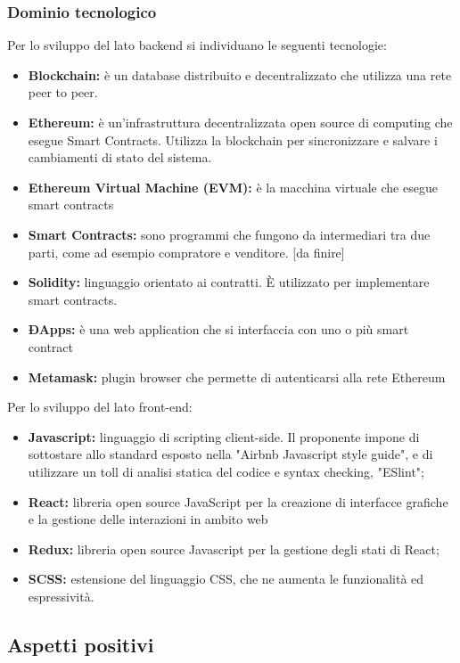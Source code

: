 \subsubsection{Dominio tecnologico}
Per lo sviluppo del lato backend si individuano le seguenti tecnologie:
\begin{itemize}
    \item \textbf{Blockchain: }è un database distribuito e 
    decentralizzato che utilizza una rete peer to peer.
	\item \textbf{Ethereum: }è un'infrastruttura decentralizzata open source di computing che
	esegue Smart Contracts. Utilizza la blockchain per sincronizzare e salvare i cambiamenti di stato
	del sistema.
	\item \textbf{Ethereum Virtual Machine (EVM): }è la macchina virtuale che esegue smart contracts
	\item \textbf{Smart Contracts: } sono programmi che fungono da intermediari tra due parti, come ad esempio
	compratore e venditore. [da finire]
	\item \textbf{Solidity: }linguaggio orientato ai contratti. \`E utilizzato per implementare smart contracts.
	\item \textbf{ÐApps: }è una web application che si interfaccia con uno o più smart contract
	\item \textbf{Metamask:} plugin browser che permette di autenticarsi alla rete Ethereum

\end{itemize}
Per lo sviluppo del lato front-end:
\begin{itemize}
	\item \textbf{Javascript:} linguaggio di scripting client-side. Il proponente impone di sottostare allo standard esposto nella "Airbnb Javascript style guide", e di utilizzare un toll di analisi statica del codice e syntax checking, "ESlint";
	\item \textbf{React:}  libreria open source JavaScript per la creazione di interfacce grafiche e la gestione delle interazioni in ambito web
	\item \textbf {Redux:} libreria open source Javascript per la gestione degli stati di React;
	
	\item \textbf{SCSS:} estensione del linguaggio CSS, che ne aumenta le funzionalità ed espressività.
\end{itemize}


\subsection{Aspetti positivi}

